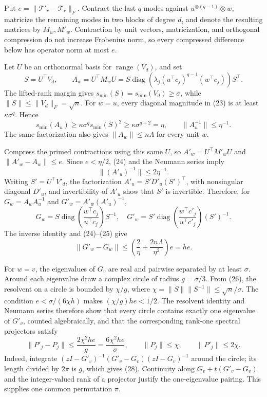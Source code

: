 Put \(e=\lVert\mathcal T'_r-\mathcal T_r\rVert_F\). Contract the last \(q\) modes against \(u^{\otimes(q-1)}\otimes w\), matricize the remaining modes in two blocks of degree \(d\), and denote the resulting matrices by \(M_w,M'_w\). Contraction by unit vectors, matricization, and orthogonal compression do not increase Frobenius norm, so every compressed difference below has operator norm at most \(e\).

Let \(U\) be an orthonormal basis for \(\operatorname{range}(V_d)\), and set
\[
 S=U^\top V_d,
 \qquad A_w=U^\top M_wU
 =S\operatorname{diag}\!\left(\lambda_j(u^\top c_j)^{q-1}(w^\top c_j)\right)S^\top. \tag{23}
\]
The lifted-rank margin gives \(s_{\min}(S)=s_{\min}(V_d)\ge\sigma\), while \(\lVert S\rVert\le\lVert V_d\rVert_F=\sqrt n\). For \(w=u\), every diagonal magnitude in (23) is at least \(\kappa\sigma^q\). Hence
\[
 s_{\min}(A_u)\ge\kappa\sigma^q s_{\min}(S)^2
 \ge\kappa\sigma^{q+2}=\eta,
 \qquad \lVert A_u^{-1}\rVert\le\eta^{-1}. \tag{24}
\]
The same factorization also gives \(\lVert A_w\rVert\le n\Lambda\) for every unit \(w\).

Compress the primed contractions using this same \(U\), so \(A'_w=U^\top M'_wU\) and \(\lVert A'_w-A_w\rVert\le e\). Since \(e<\eta/2\), (24) and the Neumann series imply
\[
 \lVert(A'_u)^{-1}\rVert\le2\eta^{-1}. \tag{25}
\]
Writing \(S'=U^\top V'_d\), the factorization \(A'_u=S'D'_u(S')^\top\), with nonsingular diagonal \(D'_u\), and invertibility of \(A'_u\) show that \(S'\) is invertible. Therefore, for \(G_w=A_wA_u^{-1}\) and \(G'_w=A'_w(A'_u)^{-1}\),
\[
 G_w=S\operatorname{diag}\!\left(\frac{w^\top c_j}{u^\top c_j}\right)S^{-1},
 \quad
 G'_w=S'\operatorname{diag}\!\left(\frac{w^\top c'_j}{u^\top c'_j}\right)(S')^{-1}. \tag{26}
\]
The inverse identity and (24)--(25) give
\[
 \lVert G'_w-G_w\rVert
 \le\left(\frac{2}{\eta}+\frac{2n\Lambda}{\eta^2}\right)e
 =he. \tag{27}
\]

For \(w=v\), the eigenvalues of \(G_v\) are real and pairwise separated by at least \(\sigma\). Around each eigenvalue draw a complex circle of radius \(g=\sigma/3\). From (26), the resolvent on a circle is bounded by \(\chi/g\), where \(\chi=\lVert S\rVert\lVert S^{-1}\rVert\le\sqrt n/\sigma\). The condition \(e<\sigma/(6\chi h)\) makes \((\chi/g)he<1/2\). The resolvent identity and Neumann series therefore show that every circle contains exactly one eigenvalue of \(G'_v\), counted algebraically, and that the corresponding rank-one spectral projectors satisfy
\[
 \lVert P'_j-P_j\rVert
 \le \frac{2\chi^2he}{g}
 =\frac{6\chi^2he}{\sigma},
 \qquad
 \lVert P_j\rVert\le\chi,
 \qquad
 \lVert P'_j\rVert\le2\chi. \tag{28}
\]
Indeed, integrate \((zI-G'_v)^{-1}(G'_v-G_v)(zI-G_v)^{-1}\) around the circle; its length divided by \(2\pi\) is \(g\), which gives (28). Continuity along \(G_v+t(G'_v-G_v)\) and the integer-valued rank of a projector justify the one-eigenvalue pairing. This supplies one common permutation \(\pi\).

